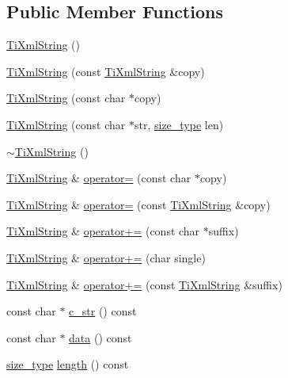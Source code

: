 \subsection*{Public Member Functions}
\begin{DoxyCompactItemize}
\item 
\hyperlink{class_ti_xml_string_a342f61e0fc2244df300b73aedf6d3fef}{TiXmlString} ()
\item 
\hyperlink{class_ti_xml_string_ac80fe17693a438c9ab2591664743fcb6}{TiXmlString} (const \hyperlink{class_ti_xml_string}{TiXmlString} \&copy)
\item 
\hyperlink{class_ti_xml_string_a06b210efc90be260b0f70703264825f5}{TiXmlString} (const char $\ast$copy)
\item 
\hyperlink{class_ti_xml_string_ac7edfc07aee21035f00c4995ac20c5d0}{TiXmlString} (const char $\ast$str, \hyperlink{class_ti_xml_string_abeb2c1893a04c17904f7c06546d0b971}{size\_\-type} len)
\item 
\hyperlink{class_ti_xml_string_a7ac03f581ca3422c4808162ab14f3450}{$\sim$TiXmlString} ()
\item 
\hyperlink{class_ti_xml_string}{TiXmlString} \& \hyperlink{class_ti_xml_string_ae0bc6147afc0ec2aa0da3a3c0a8fcfb0}{operator=} (const char $\ast$copy)
\item 
\hyperlink{class_ti_xml_string}{TiXmlString} \& \hyperlink{class_ti_xml_string_ab1f1f5d3eceaa0f22d0a7e6055ea81b0}{operator=} (const \hyperlink{class_ti_xml_string}{TiXmlString} \&copy)
\item 
\hyperlink{class_ti_xml_string}{TiXmlString} \& \hyperlink{class_ti_xml_string_ab56336ac2aa2a08d24a71eb9a2b502a5}{operator+=} (const char $\ast$suffix)
\item 
\hyperlink{class_ti_xml_string}{TiXmlString} \& \hyperlink{class_ti_xml_string_a6aa09d5240470b76d54ec709e04f8c13}{operator+=} (char single)
\item 
\hyperlink{class_ti_xml_string}{TiXmlString} \& \hyperlink{class_ti_xml_string_afdcae5ea2b4d9e194dc21226b817f417}{operator+=} (const \hyperlink{class_ti_xml_string}{TiXmlString} \&suffix)
\item 
const char $\ast$ \hyperlink{class_ti_xml_string_a5581ca641d915551d3cda90f8e7bf49b}{c\_\-str} () const 
\item 
const char $\ast$ \hyperlink{class_ti_xml_string_a00abc60f135c7ca1951c7334cc2c7993}{data} () const 
\item 
\hyperlink{class_ti_xml_string_abeb2c1893a04c17904f7c06546d0b971}{size\_\-type} \hyperlink{class_ti_xml_string_a3202f27d139a3fac79205f1f3c707727}{length} () const 

\end{DoxyCompactItemize}
